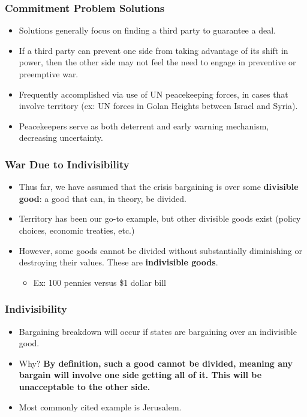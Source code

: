 \documentclass[handout]{beamer}
\begin{document}
\begin{frame} 
	\frametitle{\LARGE{Commitment Problem Solutions}}
	\begin{itemize}
		\item Solutions generally focus on finding a third party to guarantee a deal. \pause
		\item If a third party can prevent one side from taking advantage of its shift in power, then the other side may not feel the need to engage in preventive or preemptive war. \pause
		\item Frequently accomplished via use of UN peacekeeping forces, in cases that involve territory (ex: UN forces in Golan Heights between Israel and Syria). \pause
		\item Peacekeepers serve as both deterrent and early warning mechanism, decreasing uncertainty.
	\end{itemize}
\end{frame}

\begin{frame} 
	\frametitle{\LARGE{War Due to Indivisibility}}
	\begin{itemize}
		\item Thus far, we have assumed that the crisis bargaining is over some \textbf{divisible good}: a good that can, in theory, be divided.
		\item Territory has been our go-to example, but other divisible goods exist (policy choices, economic treaties, etc.)
		\item However, some goods cannot be divided without substantially diminishing or destroying their values. These are \textbf{indivisible goods}. \pause
		\begin{itemize}
			\item Ex: 100 pennies versus \$1 dollar bill
		\end{itemize}
	\end{itemize}
\end{frame}

\begin{frame} 
	\frametitle{\LARGE{Indivisibility}}
	\begin{itemize}
		\item Bargaining breakdown will occur if states are bargaining over an indivisible good. \pause
		\item Why? \textbf{By definition, such a good cannot be divided, meaning any bargain will involve one side getting all of it. This will be unacceptable to the other side.}
		\item Most commonly cited example is Jerusalem. 
	\end{itemize}
\end{frame}
\end{document}
